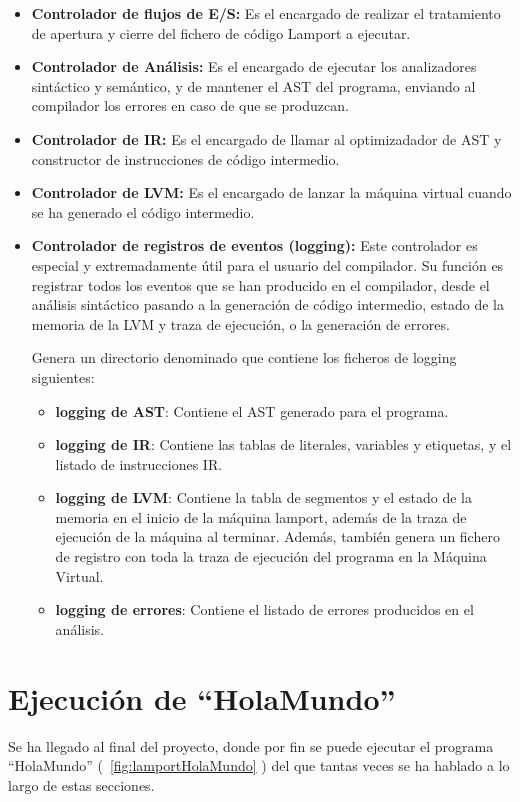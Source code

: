 \begin{itemize}
    \item \textbf{Controlador de flujos de E/S:} Es el encargado de realizar el tratamiento de apertura y cierre del fichero de código Lamport a ejecutar.
    \item \textbf{Controlador de Análisis:} Es el encargado de ejecutar los analizadores sintáctico y semántico, y de mantener el AST del programa, enviando al compilador los errores en caso de que se produzcan.
    \item \textbf{Controlador de IR:} Es el encargado de llamar al optimizadador de AST y constructor de instrucciones de código intermedio.
    \item \textbf{Controlador de LVM:} Es el encargado de lanzar la máquina virtual cuando se ha generado el código intermedio.
    \item \textbf{Controlador de registros de eventos (logging):} Este controlador es especial y extremadamente útil para el usuario del compilador. Su función es registrar todos los eventos que se han producido en el compilador, desde el análisis sintáctico pasando a la generación de código intermedio, estado de la memoria de la LVM y traza de ejecución, o la generación de errores.

    Genera un directorio denominado  que contiene los ficheros de logging siguientes:
    \begin{itemize}
        \item \textbf{logging de AST}: Contiene el AST generado para el programa.
        \item \textbf{logging de IR}: Contiene las tablas de literales, variables y etiquetas, y el listado de instrucciones IR.
        \item \textbf{logging de LVM}: Contiene la tabla de segmentos y el estado de la memoria en el inicio de la máquina lamport, además de la traza de ejecución de la máquina al terminar. Además, también genera un fichero de registro con toda la traza de ejecución del programa en la Máquina Virtual.
        \item \textbf{logging de errores}: Contiene el listado de errores producidos en el análisis.
    \end{itemize}
\end{itemize}

\section{Ejecución de ``HolaMundo''}
Se ha llegado al final del proyecto, donde por fin se puede ejecutar el programa ``HolaMundo'' (~\ref{fig:lamportHolaMundo} ) del que tantas veces se ha hablado a lo largo de estas secciones. 



